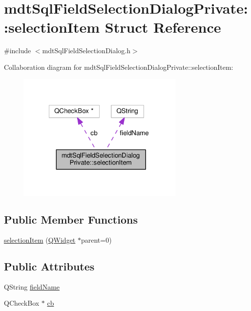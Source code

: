 \hypertarget{structmdt_sql_field_selection_dialog_private_1_1selection_item}{\section{mdt\-Sql\-Field\-Selection\-Dialog\-Private\-:\-:selection\-Item Struct Reference}
\label{structmdt_sql_field_selection_dialog_private_1_1selection_item}
}


{\ttfamily \#include $<$mdt\-Sql\-Field\-Selection\-Dialog.\-h$>$}



Collaboration diagram for mdt\-Sql\-Field\-Selection\-Dialog\-Private\-:\-:selection\-Item\-:\nopagebreak
\begin{figure}[H]
\begin{center}
\leavevmode
\includegraphics[width=233pt]{structmdt_sql_field_selection_dialog_private_1_1selection_item__coll__graph}
\end{center}
\end{figure}
\subsection*{Public Member Functions}
\begin{DoxyCompactItemize}
\item 
\hyperlink{structmdt_sql_field_selection_dialog_private_1_1selection_item_af63aae7a8d7c4e00d59a174174927976}{selection\-Item} (\hyperlink{class_q_widget}{Q\-Widget} $\ast$parent=0)
\end{DoxyCompactItemize}
\subsection*{Public Attributes}
\begin{DoxyCompactItemize}
\item 
Q\-String \hyperlink{structmdt_sql_field_selection_dialog_private_1_1selection_item_a77cd7117a117e9eb7124fbd57267ba56}{field\-Name}
\item 
Q\-Check\-Box $\ast$ \hyperlink{structmdt_sql_field_selection_dialog_private_1_1selection_item_ac9a676bd8100fdec77985c1bbfa1dfc0}{cb}
\end{DoxyCompactItemize}


